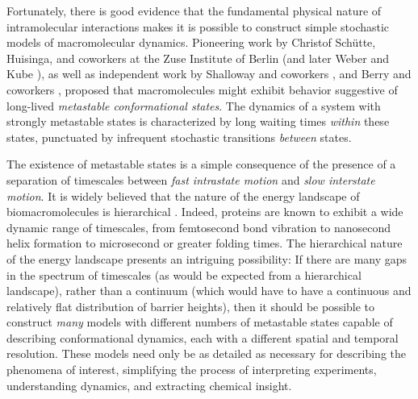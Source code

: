 

Fortunately, there is good evidence that the fundamental physical nature of intramolecular interactions makes it is possible to construct simple stochastic models of macromolecular dynamics.
Pioneering work by Christof Sch\"{u}tte, Huisinga, and coworkers at the Zuse Institute of Berlin \cite{schuette:1999a,schuette-thesis,fischer-thesis,deuflhard:2000a,galliat:2000a,huisinga-thesis,galliat-thesis,fischer-thesis} (and later Weber and Kube \cite{weber-thesis:2006a,kube:2006a}), as well as independent work by Shalloway and coworkers \cite{shalloway:1996a,ulitsky:1998a,ulitsky:1999a,church:2001a}, and Berry and coworkers \cite{ball:1998b,despa:2001a,levy:2002a,despa:2003a}, proposed that macromolecules might exhibit behavior suggestive of long-lived \emph{metastable conformational states}. %
The dynamics of a system with strongly metastable states is characterized by long waiting times \emph{within} these states, punctuated by infrequent stochastic transitions \emph{between} states.

The existence of metastable states is a simple consequence of the presence of a separation of timescales between \emph{fast intrastate motion} and \emph{slow interstate motion}.
It is widely believed that the nature of the energy landscape of biomacromolecules is hierarchical \cite{ansari:1985a,bai:1989a,becker:1997a,levy:2001a,levy:2002a}.
Indeed, proteins are known to exhibit a wide dynamic range of timescales, from femtosecond bond vibration to nanosecond helix formation to microsecond or greater folding times.
The hierarchical nature of the energy landscape presents an intriguing possibility: If there are many gaps in the spectrum of timescales (as would be expected from a hierarchical landscape), rather than a continuum (which would have to have a continuous and relatively flat distribution of barrier heights), then it should be possible to construct \emph{many} models with different numbers of metastable states capable of describing conformational dynamics, each with a different spatial and temporal resolution.
These models need only be as detailed as necessary for describing the phenomena of interest, simplifying the process of interpreting experiments, understanding dynamics, and extracting chemical insight.

